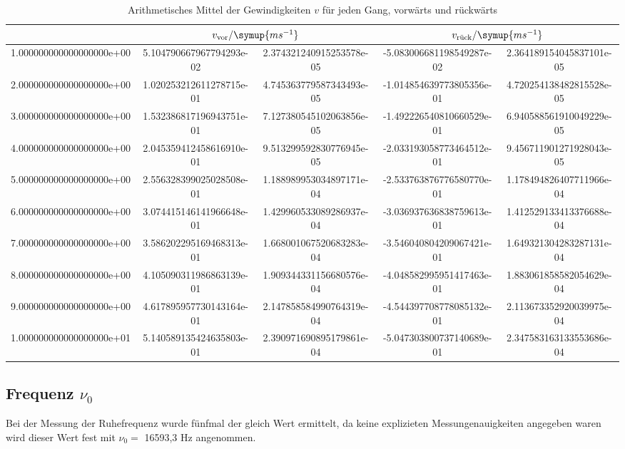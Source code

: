 \begin{table}
  \centering
  \caption{Arithmetisches Mittel der Gewindigkeiten $v$ für jeden Gang, vorwärts und rückwärts}
  \label{tab:v}
  \begin{tabular}{S[round-precision=0] S@{\qquad $\pm$} S S@{\qquad$\pm$} S}
    \toprule
     &  &
     \\
    \midrule
    1.000000000000000000e+00 & 5.104790667967794293e-02 & 2.374321240915253578e-05 & -5.083006681198549287e-02 & 2.364189154045837101e-05 \\
     2.000000000000000000e+00 & 1.020253212611278715e-01 & 4.745363779587343493e-05 & -1.014854639773805356e-01 & 4.720254138482815528e-05 \\
     3.000000000000000000e+00 & 1.532386817196943751e-01 & 7.127380545102063856e-05 & -1.492226540810660529e-01 & 6.940588561910049229e-05 \\
     4.000000000000000000e+00 & 2.045359412458616910e-01 & 9.513299592830776945e-05 & -2.033193058773464512e-01 & 9.456711901271928043e-05 \\
     5.000000000000000000e+00 & 2.556328399025028508e-01 & 1.188989953034897171e-04 & -2.533763876776580770e-01 & 1.178494826407711966e-04 \\
     6.000000000000000000e+00 & 3.074415146141966648e-01 & 1.429960533089286937e-04 & -3.036937636838759613e-01 & 1.412529133413376688e-04 \\
     7.000000000000000000e+00 & 3.586202295169468313e-01 & 1.668001067520683283e-04 & -3.546040804209067421e-01 & 1.649321304283287131e-04 \\
     8.000000000000000000e+00 & 4.105090311986863139e-01 & 1.909344331156680576e-04 & -4.048582995951417463e-01 & 1.883061858582054629e-04 \\
     9.000000000000000000e+00 & 4.617895957730143164e-01 & 2.147858584990764319e-04 & -4.544397708778085132e-01 & 2.113673352920039975e-04 \\
     1.000000000000000000e+01 & 5.140589135424635803e-01 & 2.390971690895179861e-04 & -5.047303800737140689e-01 & 2.347583163133553686e-04 \\
         \bottomrule
  \end{tabular}
\end{table}
\FloatBarrier
\subsection{Frequenz \texorpdfstring{$\nu_0$}{[math]}}
Bei der Messung der Ruhefrequenz wurde fünfmal der gleich Wert ermittelt, da
keine explizieten Messungenauigkeiten angegeben waren wird dieser Wert fest
mit $\nu_0 = $ 16593,3 Hz angenommen.
